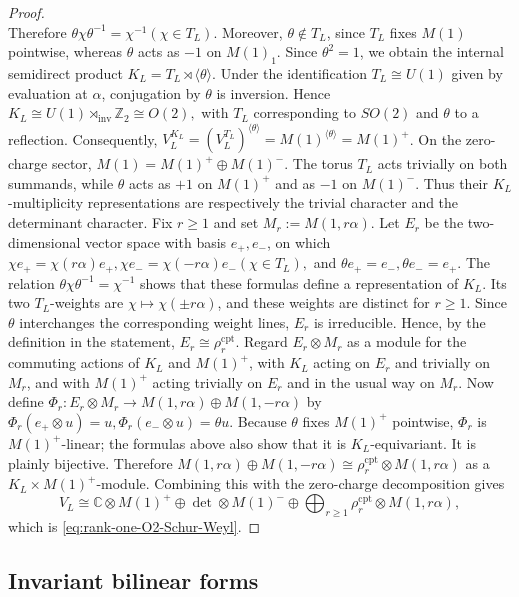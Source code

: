 \documentclass[12pt,leqno]{amsart}
\numberwithin{equation}{section} \newtheorem{thm}{Theorem}[section] \newtheorem{lem}[thm]{Lemma} \newtheorem{ex}[thm]{Example} \newtheorem{prop}[thm]{Proposition} \newtheorem{cor}[thm]{Corollary} \newtheorem{defi}[thm]{Definition} \newtheorem{rmk}[thm]{Remark} \newtheorem{notation}[thm]{Notation}
\begin{document}
\begin{proof}
$$$$ Therefore $ \theta\chi\theta^{-1}=\chi^{-1} (\chi\in T_L). $ Moreover, \(\theta\notin T_L\), since \(T_L\) fixes \(M(1)\) pointwise, whereas \(\theta\) acts as \(-1\) on \(M(1)_1\). Since \(\theta^2=1\), we obtain the internal semidirect product $ K_L=T_L\rtimes\langle\theta\rangle. $ Under the identification \(T_L\cong U(1)\) given by evaluation at \(\alpha\), conjugation by \(\theta\) is inversion. Hence $ K_L\cong U(1)\rtimes_{\mathrm{inv}}\mathbb Z_2\cong O(2), $ with \(T_L\) corresponding to \(SO(2)\) and \(\theta\) to a reflection. Consequently, \(V_L^{K_L}=(V_L^{T_L})^{\langle\theta\rangle}=M(1)^{\langle\theta\rangle}=M(1)^+\). On the zero-charge sector, $ M(1)=M(1)^+\oplus M(1)^-. $ The torus \(T_L\) acts trivially on both summands, while \(\theta\) acts as \(+1\) on \(M(1)^+\) and as \(-1\) on \(M(1)^-\). Thus their \(K_L\)-multiplicity representations are respectively the trivial character and the determinant character. Fix \(r\ge1\) and set \(M_r:=M(1,r\alpha)\). Let \(E_r\) be the two-dimensional vector space with basis \(e_+,e_-\), on which $ \chi e_+=\chi(r\alpha)e_+, \chi e_-=\chi(-r\alpha)e_- (\chi\in T_L), $ and $ \theta e_+=e_-, \theta e_-=e_+. $ The relation \(\theta\chi\theta^{-1}=\chi^{-1}\) shows that these formulas define a representation of \(K_L\). Its two \(T_L\)-weights are \(\chi\mapsto\chi(\pm r\alpha)\), and these weights are distinct for \(r\ge1\). Since \(\theta\) interchanges the corresponding weight lines, \(E_r\) is irreducible. Hence, by the definition in the statement, $ E_r\cong\rho_r^{\mathrm{cpt}}. $ Regard \(E_r\otimes M_r\) as a module for the commuting actions of \(K_L\) and \(M(1)^+\), with \(K_L\) acting on \(E_r\) and trivially on \(M_r\), and with \(M(1)^+\) acting trivially on \(E_r\) and in the usual way on \(M_r\). Now define \(\Phi_r:E_r\otimes M_r\longrightarrow M(1,r\alpha)\oplus M(1,-r\alpha)\) by $ \Phi_r(e_+\otimes u)=u, \Phi_r(e_-\otimes u)=\theta u. $ Because \(\theta\) fixes \(M(1)^+\) pointwise, \(\Phi_r\) is \(M(1)^+\)-linear; the formulas above also show that it is \(K_L\)-equivariant. It is plainly bijective. Therefore \(M(1,r\alpha)\oplus M(1,-r\alpha)\cong\rho_r^{\mathrm{cpt}}\otimes M(1,r\alpha)\) as a \(K_L\times M(1)^+\)-module. Combining this with the zero-charge decomposition gives $$ V_L\cong \mathbb C\otimes M(1)^+ \oplus\det\otimes M(1)^- \oplus\bigoplus_{r\ge1} \rho_r^{\mathrm{cpt}}\otimes M(1,r\alpha), $$ which is \eqref{eq:rank-one-O2-Schur-Weyl}.
\end{proof}

\subsection{Invariant bilinear forms}
\label{subsec:Li-invariant}
\end{document}
